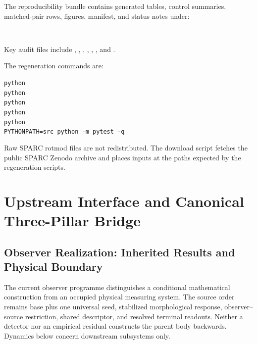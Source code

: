 \documentclass[11pt]{article}
\begin{document}
The reproducibility bundle contains generated tables, control summaries, matched-pair rows, figures, manifest, and status notes under:

\begin{flushleft}
\footnotesize
{}\\
\end{flushleft}
Key audit files include , , , , , , and .

The regeneration commands are:

\begin{flushleft}
\footnotesize
\texttt{python} \\
\texttt{python} \\
\texttt{python} \\
\texttt{python} \\
\texttt{python} \\
\texttt{PYTHONPATH=src python -m pytest -q}\\
\end{flushleft}
Raw SPARC rotmod files are not redistributed. The download script fetches the public SPARC Zenodo archive and places inputs at the paths expected by the regeneration scripts.

\section{Upstream Interface and Canonical Three-Pillar Bridge}
\label{sec:upstream-interface}

\subsection{Observer Realization: Inherited Results and Physical Boundary}
\label{sec:observer-update-20260914}
The current observer programme distinguishes a conditional mathematical
construction from an occupied physical measuring system. The source order
remains base plus one universal seed, stabilized morphological response,
observer--source restriction, shared descriptor, and resolved terminal
readouts. Neither a detector nor an empirical residual constructs the parent
body backwards. Dynamics below concern downstream subsystems only.
\end{document}

